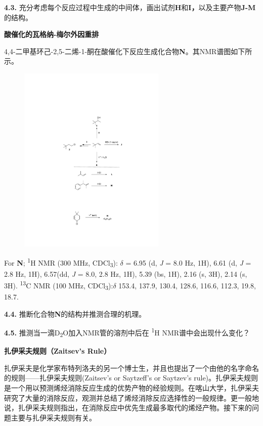 \noindent\textbf{4.3.}
充分考虑每个反应过程中生成的中间体，画出试剂\textbf{H}和\textbf{I，}以及主要产物\textbf{J-M}的结构。

\noindent\textbf{酸催化的瓦格纳-梅尔外因重排}

4,4-二甲基环己-2,5-二烯-1-酮在酸催化下反应生成化合物\textbf{N}。其NMR谱图如下所示。

\begin{figure}[h!]
	\centering
	\includegraphics[width=7cm]{./pic/t4-5.pdf}
\end{figure}

For \textbf{N}; \textsuperscript{1}H NMR (300 MHz, CDCl\textsubscript{3}): $\delta$ = 6.95 (d,
\emph{J} = 8.0 Hz, 1H), 6.61 (d, \emph{J} = 2.8 Hz, 1H), 6.57(dd, \emph{J} = 8.0, 2.8 Hz, 1H), 5.39 (bs, 1H), 2.16 (s, 3H), 2.14 (s,
3H). \textsuperscript{13}C NMR (100 MHz, CDCl\textsubscript{3}):$\delta$ 153.4, 137.9, 130.4, 128.6, 116.6, 112.3, 19.8, 18.7.

\noindent\textbf{4.4.} 推断化合物\textbf{N}的结构并推测合理的机理。

\noindent\textbf{4.5.} 推测当一滴D\textsubscript{2}O加入NMR管的溶剂中后在
\textsuperscript{1}H NMR谱中会出现什么变化？

\noindent\textbf{扎伊采夫规则（Zaitsev's Rule）}

扎伊采夫是化学家布特列洛夫的另一个博士生，并且也提出了一个由他的名字命名的规则------扎伊采夫规则(Zaitsev's or Saytzeff's or Saytzev's rule)。扎伊采夫规则是一个用以预测烯烃消除反应生成的优势产物的经验规则。在喀山大学，扎伊采夫研究了大量的消除反应，观测并总结了烯烃消除反应选择性的一般规律。更一般地说，扎伊采夫规则指出，在消除反应中优先生成最多取代的烯烃产物。接下来的问题主要与扎伊采夫规则有关。

